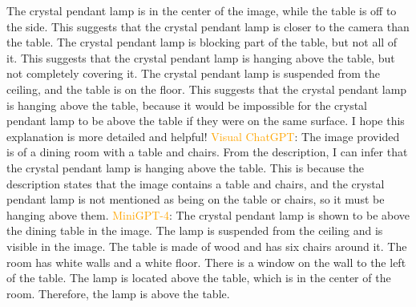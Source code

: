 \begin{enumerate}
    The crystal pendant lamp is in the center of the image, while the table is off to the side. This suggests that the crystal pendant lamp is closer to the camera than the table.
    The crystal pendant lamp is blocking part of the table, but not all of it. This suggests that the crystal pendant lamp is hanging above the table, but not completely covering it.
    The crystal pendant lamp is suspended from the ceiling, and the table is on the floor. This suggests that the crystal pendant lamp is hanging above the table, because it would be impossible for the crystal pendant lamp to be above the table if they were on the same surface.
    I hope this explanation is more detailed and helpful!
    \subitem \textcolor{orange}{Visual ChatGPT}: The image provided is of a dining room with a table and chairs. From the description, I can infer that the crystal pendant lamp is hanging above the table. This is because the description states that the image contains a table and chairs, and the crystal pendant lamp is not mentioned as being on the table or chairs, so it must be hanging above them.
    \subitem \textcolor{orange}{MiniGPT-4}: The crystal pendant lamp is shown to be above the dining table in the image. The lamp is suspended from the ceiling and is visible in the image. The table is made of wood and has six chairs around it. The room has white walls and a white floor. There is a window on the wall to the left of the table. The lamp is located above the table, which is in the center of the room. Therefore, the lamp is above the table.
\end{enumerate}
